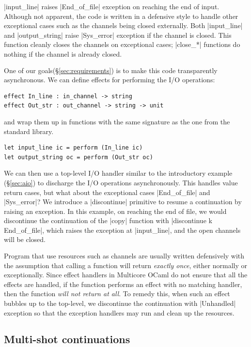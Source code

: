 \documentclass[sigplan,10pt,review,anonymous]{acmart}\settopmatter{printfolios=true,printccs=false,printacmref=false}
\begin{document}
|input_line| raises |End_of_file| exception on reaching the end of input.
Although not apparent, the code is written in a defensive style to handle other
exceptional cases such as the channels being closed externally. Both
|input_line| and |output_string| raise |Sys_error| exception if the channel is
closed. This function cleanly closes the channels on exceptional cases;
|close_*| functions do nothing if the channel is already closed.

One of our goals(\S\ref{sec:requirements}) is to make this code transparently
asynchronous. We can define effects for performing the I/O operations:
\begin{lstlisting}
effect In_line : in_channel -> string
effect Out_str : out_channel -> string -> unit
\end{lstlisting}
\noindent and wrap them up in functions with the same signature as the one from
the standard library.
\begin{lstlisting}
let input_line ic = perform (In_line ic)
let output_string oc = perform (Out_str oc)
\end{lstlisting}

We can then use a top-level I/O handler similar to the introductory example
(\S\ref{sec:aio}) to discharge the I/O operations asynchronously. This handles
value return cases, but what about the exceptional cases |End_of_file| and
|Sys_error|? We introduce a |discontinue| primitive to resume a continuation by
raising an exception. In this example, on reaching the end of file, we would
discontinue the continuation of the |copy| function with |discontinue k End_of_file|,
which raises the exception at |input_line|, and the open channels
will be closed.

Program that use resources such as channels are usually written defensively
with the assumption that calling a function will return \emph{exactly once},
either normally or exceptionally. Since effect handlers in Multicore OCaml do
not ensure that all the effects are handled, if the function performs an effect
with no matching handler, then the function \emph{will not return at all}. To
remedy this, when such an effect bubbles up to the top-level, we discontinue
the continuation with |Unhandled| exception so that the exception handlers may
run and clean up the resources.

\subsection{Multi-shot continuations}
\end{document}
